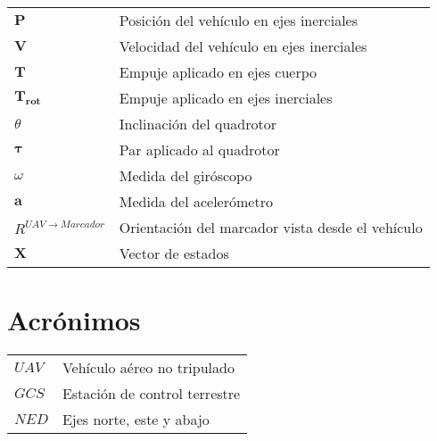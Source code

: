 \chapter*{\notationname}
\pagestyle{especial}
\chaptermark{\notationname}
{}
\begin{longtable}{p{3cm}p{8.5cm}}
$\bm{P}$ & Posición del vehículo en ejes inerciales  \\
$\bm{V}$ & Velocidad del vehículo en ejes inerciales \\
$\bm{T}$ & Empuje aplicado en ejes cuerpo \\
$\bm{T_{rot}}$ & Empuje aplicado en ejes inerciales \\
$\theta$ &  Inclinación del quadrotor \\
$\bm{\tau}$ &  Par aplicado al quadrotor \\
$\omega$ & Medida del giróscopo \\
$\bm{a}$ & Medida del acelerómetro \\
$R^{UAV\rightarrow Marcador}$  & Orientación del marcador vista desde el vehículo\\
$\bm{X}$ &  Vector de estados \\
\end{longtable}
\newpage

\chapter*{Acrónimos}
\pagestyle{especial}
{}
\begin{longtable}{p{3cm}p{8.5cm}}
$UAV$ & Vehículo aéreo no tripulado\\
$GCS$ & Estación de control terrestre \\
$NED$ & Ejes norte, este y abajo \\
\end{longtable}
\newpage

